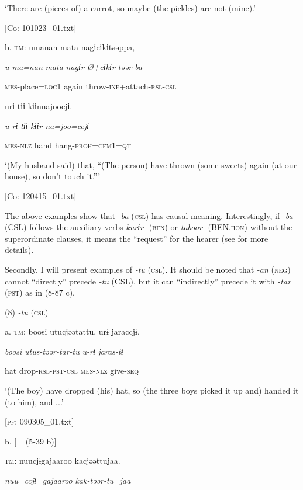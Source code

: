       ‘There are (pieces of) a carrot, so maybe (the pickles) are not (mine).’

      [Co: 101023\_01.txt]

  b.  \textsc{tm}:  umanan  mata  nagɨcɨkɨtəəppa,

      \textit{u-ma=nan}  \textit{mata}  \textit{nagɨr-Ø+cɨkɨr-təər-ba}

      \textsc{mes}-place=\textsc{loc}1  again  throw-\textsc{inf}+attach-\textsc{rsl}-\textsc{csl}

      urɨ  tɨɨ  kɨɨnnajoocjɨ.

      \textit{u-rɨ}  \textit{tɨɨ}  \textit{kɨɨr-na=joo=ccjɨ}

      \textsc{mes}-\textsc{nlz}  hand  hang-\textsc{proh}=\textsc{cfm}1=\textsc{qt}

      ‘(My husband said) that, “(The person) have thrown (some sweets) again (at our house), so don’t touch it.”’

      [Co: 120415\_01.txt]

The above examples show that \textit{{}-ba} (\textsc{csl}) has causal meaning. Interestingly, if \textit{{}-ba} (CSL) follows the auxiliary verbs \textit{kurɨr-} (\textsc{ben}) or \textit{taboor-} (BEN.\textsc{hon}) without the superordinate clauses, it means the “request” for the hearer (see  for more details).

  Secondly, I will present examples of \textit{{}-tu} (\textsc{csl}). It should be noted that \textit{-an} (\textsc{neg}) cannot “directly” precede \textit{{}-tu} (CSL), but it can “indirectly” precede it with \textit{{}-tar} (\textsc{pst}) as in (8-87 c).

(8)  \textit{{}-tu} (\textsc{csl})

  a.  \textsc{tm}:  boosi  utucjəətattu,  urɨ  jaraccjɨ,

      \textit{boosi}  \textit{utus-təər-tar-tu}  \textit{u-rɨ}  \textit{jaras-tɨ}

      hat  drop-\textsc{rsl}-\textsc{pst}-\textsc{csl}  \textsc{mes}-\textsc{nlz}  give-\textsc{seq}

      ‘(The boy) have dropped (his) hat, so (the three boys picked it up and) handed it (to him), and ...’

      [\textsc{pf}: 090305\_01.txt]

  b.  [= (5-39 b)]

    \textsc{tm}:  nuucjɨgajaaroo  kacjəəttujaa.

      \textit{nuu=ccjɨ=gajaaroo}  \textit{kak-təər-tu=jaa}

